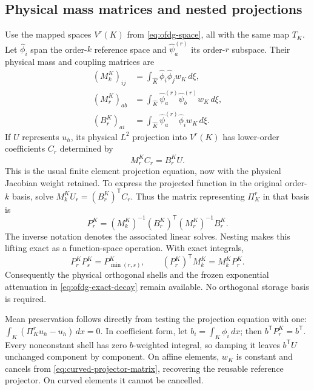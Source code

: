 \subsection{Physical mass matrices and nested projections}
Use the mapped spaces $V^r(K)$ from \cref{eq:ofdg-space}, all with the same
map $T_K$. Let $\widehat\phi_i$ span the order-$k$ reference space and
$\widehat\psi_a^{(r)}$ its order-$r$ subspace. Their physical mass and coupling
matrices are
\begin{align}
 (M_k^K)_{ij}&=\int_{\widehat K}\widehat\phi_i\widehat\phi_j w_K\,d\xi,\\
 (M_r^K)_{ab}&=\int_{\widehat K}
       \widehat\psi_a^{(r)}\widehat\psi_b^{(r)}w_K\,d\xi,\\
 (B_r^K)_{ai}&=\int_{\widehat K}
       \widehat\psi_a^{(r)}\widehat\phi_iw_K\,d\xi.
 \label{eq:curved-weighted-masses}
\end{align}
If $U$ represents $u_h$, its physical $L^2$ projection into $V^r(K)$ has
lower-order coefficients $C_r$ determined by
\begin{equation}
 M_r^K C_r=B_r^K U.
 \label{eq:curved-projection-solve}
\end{equation}
This is the usual finite element projection equation, now with the physical
Jacobian weight retained. To express the projected function in the original
order-$k$ basis, solve $M_k^K U_r=(B_r^K)^{\mathsf T}C_r$. Thus the matrix
representing $\Pi_K^r$ in that basis is
\begin{equation}
 P_r^K=(M_k^K)^{-1}(B_r^K)^{\mathsf T}(M_r^K)^{-1}B_r^K.
 \label{eq:curved-projector-matrix}
\end{equation}
The inverse notation denotes the associated linear solves. Nesting makes
this lifting exact as a function-space operation. With exact integrals,
\begin{equation}
 P_r^KP_s^K=P_{\min(r,s)}^K,\qquad
 (P_r^K)^{\mathsf T}M_k^K=M_k^KP_r^K.
 \label{eq:curved-projector-identities}
\end{equation}
Consequently the physical orthogonal shells and the frozen exponential
attenuation in \cref{eq:ofdg-exact-decay} remain available. No orthogonal
storage basis is required.

Mean preservation follows directly from testing the projection equation with
one: $\int_K(\Pi_K^r u_h-u_h)\,dx=0$. In coefficient form, let
$b_i=\int_K\phi_i\,dx$; then $b^{\mathsf T}P_r^K=b^{\mathsf T}$. Every
nonconstant shell has zero $b$-weighted integral, so damping it leaves
$b^{\mathsf T}U$ unchanged component by component. On affine elements,
$w_K$ is constant and cancels from \cref{eq:curved-projector-matrix}, recovering
the reusable reference projector. On curved elements it cannot be cancelled.

